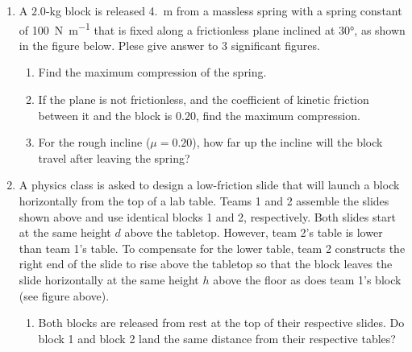 \documentclass{../../../oss-classkick}
\begin{document}
\begin{enumerate}[leftmargin=15pt]
\item A $2.0$-\si{\kilo\gram} block is released \SI{4.}{\metre} from a massless
  spring with a spring constant of \SI{100}{\newton\per\metre} that is fixed
  along a frictionless plane inclined at \ang{30}, as shown in the figure below.
  Plese give answer to $3$ significant figures.
  \begin{center}
  \end{center}
  \begin{enumerate}[noitemsep,leftmargin=20pt]
  \item Find the maximum compression of the spring.
  \item If the plane is not frictionless, and the coefficient of kinetic
    friction between it and the block is $0.20$, find the maximum compression.
  \item For the rough incline ($\mu=0.20$), how far up the incline will the
    block travel after leaving the spring?
  \end{enumerate}
  \newpage

  \begin{center}
  \end{center}
\item A physics class is asked to design a low-friction slide that will launch
  a block horizontally from the top of a lab table. Teams 1 and 2 assemble the
  slides shown above and use identical blocks 1 and 2, respectively. Both
  slides start at the same height $d$ above the tabletop. However, team 2's
  table is lower than team 1's table. To compensate for the lower table, team 2
  constructs the right end of the slide to rise above the tabletop so that the
  block leaves the slide horizontally at the same height $h$ above the floor as
  does team 1's block (see figure above).
  \begin{enumerate}[nosep,leftmargin=20pt]
  \item Both blocks are released from rest at the top of their respective
    slides. Do block 1 and block 2 land the same distance from their respective
    tables?


\end{enumerate}
\end{enumerate}
\end{document}
